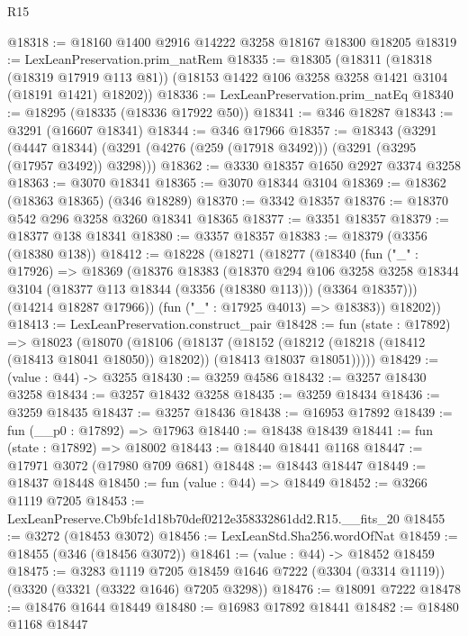 \begin{lexlean}{R15}
\begin{coremodule}
@18318 := @18160 @1400 @2916 @14222 @3258 @18167 @18300 @18205
@18319 := LexLeanPreservation.prim_natRem
@18335 := @18305
    (@18311
      (@18318 (@18319 @17919 @113 @81))
      (@18153 @1422 @106 @3258 @3258 @1421 @3104 (@18191 @1421) @18202))
@18336 := LexLeanPreservation.prim_natEq
@18340 := @18295 (@18335 (@18336 @17922 @50))
@18341 := @346 @18287
@18343 := @3291 (@16607 @18341)
@18344 := @346 @17966
@18357 := @18343
    (@3291
      (@4447 @18344)
      (@3291 (@4276 (@259 (@17918 @3492))) (@3291 (@3295 (@17957 @3492)) @3298)))
@18362 := @3330 @18357 @1650 @2927 @3374 @3258
@18363 := @3070 @18341
@18365 := @3070 @18344 @3104
@18369 := @18362 (@18363 @18365) (@346 @18289)
@18370 := @3342 @18357
@18376 := @18370 @542 @296 @3258 @3260 @18341 @18365
@18377 := @3351 @18357
@18379 := @18377 @138 @18341
@18380 := @3357 @18357
@18383 := @18379 (@3356 (@18380 @138))
@18412 := @18228
    (@18271
      (@18277
        (@18340
          (fun ("_" : @17926) =>
          @18369
            (@18376
              @18383
              (@18370
                @294
                @106
                @3258
                @3258
                @18344
                @3104
                (@18377 @113 @18344 (@3356 (@18380 @113)))
                (@3364 @18357)))
            (@14214 @18287 @17966))
          (fun ("_" : @17925 @4013) => @18383))
        @18202))
@18413 := LexLeanPreservation.construct_pair
@18428 := fun (state : @17892) =>
  @18023
    (@18070
      (@18106
        (@18137
          (@18152
            (@18212 (@18218 (@18412 (@18413 @18041 @18050)) @18202))
            (@18413 @18037 @18051)))))
@18429 := (value : @44) -> @3255
@18430 := @3259 @4586
@18432 := @3257 @18430 @3258
@18434 := @3257 @18432 @3258
@18435 := @3259 @18434
@18436 := @3259 @18435
@18437 := @3257 @18436
@18438 := @16953 @17892
@18439 := fun (__p0 : @17892) => @17963
@18440 := @18438 @18439
@18441 := fun (state : @17892) => @18002
@18443 := @18440 @18441 @1168
@18447 := @17971 @3072 (@17980 @709 @681)
@18448 := @18443 @18447
@18449 := @18437 @18448
@18450 := fun (value : @44) => @18449
@18452 := @3266 @1119 @7205
@18453 := LexLeanPreserve.Cb9bfc1d18b70def0212e358332861dd2.R15.__fits_20
@18455 := @3272 (@18453 @3072)
@18456 := LexLeanStd.Sha256.wordOfNat
@18459 := @18455 (@346 (@18456 @3072))
@18461 := (value : @44) -> @18452 @18459
@18475 := @3283
    @1119
    @7205
    @18459
    @1646
    @7222
    (@3304 (@3314 @1119))
    (@3320 (@3321 (@3322 @1646) @7205 @3298))
@18476 := @18091 @7222
@18478 := @18476 @1644 @18449
@18480 := @16983 @17892 @18441
@18482 := @18480 @1168 @18447

\end{coremodule}
\end{lexlean}
